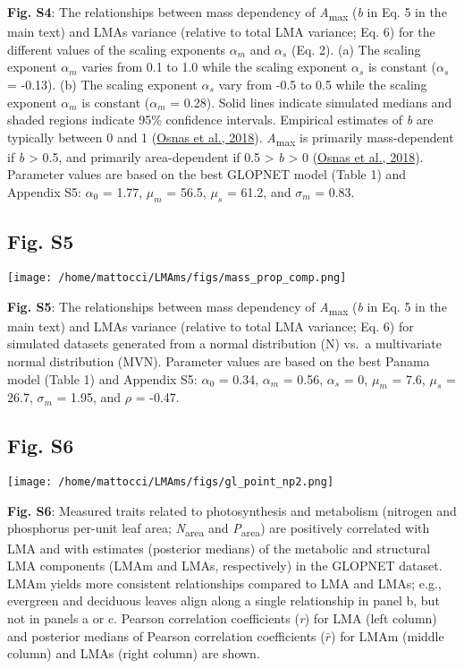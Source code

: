 \documentclass[
  12pt,
  letterpaper,
  DIV=11,
  numbers=noendperiod]{scrartcl}
\begin{document}
\textbf{Fig. S4}: The relationships between mass dependency of
\emph{A}\textsubscript{max} (\emph{b} in Eq. 5 in the main text) and
LMAs variance (relative to total LMA variance; Eq. 6) for the different
values of the scaling exponents \(\alpha_m\) and \(\alpha_s\) (Eq. 2).
(a) The scaling exponent \(\alpha_m\) varies from 0.1 to 1.0 while the
scaling exponent \(\alpha_s\) is constant (\(\alpha_s\) = -0.13). (b)
The scaling exponent \(\alpha_s\) vary from -0.5 to 0.5 while the
scaling exponent \(\alpha_m\) is constant (\(\alpha_m\) = 0.28). Solid
lines indicate simulated medians and shaded regions indicate 95\%
confidence intervals. Empirical estimates of \emph{b} are typically
between 0 and 1 (\protect\hyperlink{ref-Osnas2018}{Osnas et al., 2018}).
\emph{A}\textsubscript{max} is primarily mass-dependent if \emph{b}
\textgreater{} 0.5, and primarily area-dependent if 0.5 \textgreater{}
\emph{b} \textgreater{} 0 (\protect\hyperlink{ref-Osnas2018}{Osnas et
al., 2018}). Parameter values are based on the best GLOPNET model (Table
1) and Appendix S5: \(\alpha_0\) = 1.77, \(\mu_m\) = 56.5, \(\mu_s\) =
61.2, and \(\sigma_m\) = 0.83.

\newpage

\hypertarget{fig.-s5}{%
\subsection{Fig. S5}\label{fig.-s5}}

\texttt{[image: /home/mattocci/LMAms/figs/mass\_prop\_comp.png]}

\textbf{Fig. S5}: The relationships between mass dependency of
\emph{A}\textsubscript{max} (\emph{b} in Eq. 5 in the main text) and
LMAs variance (relative to total LMA variance; Eq. 6) for simulated
datasets generated from a normal distribution (N) vs.~a multivariate
normal distribution (MVN). Parameter values are based on the best Panama
model (Table 1) and Appendix S5: \(\alpha_0\) = 0.34, \(\alpha_m\) =
0.56, \(\alpha_s\) = 0, \(\mu_m\) = 7.6, \(\mu_s\) = 26.7, \(\sigma_m\)
= 1.95, and \(\rho\) = -0.47.

\newpage

\hypertarget{fig.-s6}{%
\subsection{Fig. S6}\label{fig.-s6}}

\texttt{[image: /home/mattocci/LMAms/figs/gl\_point\_np2.png]}

\textbf{Fig. S6}: Measured traits related to photosynthesis and
metabolism (nitrogen and phosphorus per-unit leaf area;
\emph{N}\textsubscript{area} and \emph{P}\textsubscript{area}) are
positively correlated with LMA and with estimates (posterior medians) of
the metabolic and structural LMA components (LMAm and LMAs,
respectively) in the GLOPNET dataset. LMAm yields more consistent
relationships compared to LMA and LMAs; e.g., evergreen and deciduous
leaves align along a single relationship in panel b, but not in panels a
or c. Pearson correlation coefficients (\emph{r}) for LMA (left column)
and posterior medians of Pearson correlation coefficients (\(\bar{r}\))
for LMAm (middle column) and LMAs (right column) are shown.
\end{document}
